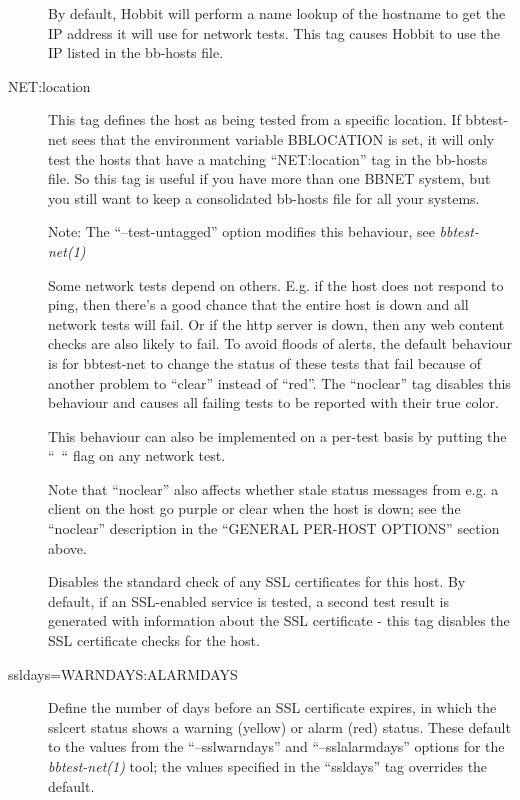 \begin{description}
\item[] By default, Hobbit will perform a name lookup of the
  hostname to get the IP address it will use for network tests. This
  tag causes Hobbit to use the IP listed in the bb-hosts file. 


 

\item[NET:location] This tag defines the host as being tested from a
  specific location. If bbtest-net sees that the environment variable
  BBLOCATION is set, it will only test the hosts that have a matching
  ``NET:location'' tag in the bb-hosts file. So this tag is useful if
  you have more than one BBNET system, but you still want to keep a
  consolidated bb-hosts file for all your systems. 


  Note: The ``--test-untagged'' option modifies this behaviour, see \emph{bbtest-net(1)}



 

\item[] Some network tests depend on others. E.g. if the host
  does not respond to ping, then there's a good chance that the entire
  host is down and all network tests will fail. Or if the http server
  is down, then any web content checks are also likely to fail. To
  avoid floods of alerts, the default behaviour is for bbtest-net to
  change the status of these tests that fail because of another
  problem to ``clear'' instead of ``red''. The ``noclear'' tag
  disables this behaviour and causes all failing tests to be reported
  with their true color. 


  This behaviour can also be implemented on a per-test basis by putting the ``~`` flag on any network test. 


  Note that ``noclear'' also affects whether stale status messages
  from e.g. a client on the host go purple or clear when the host is
  down; see the ``noclear'' description in the ``GENERAL PER-HOST
  OPTIONS'' section above. 

\item[] Disables the standard check of any SSL certificates
  for this host. By default, if an SSL-enabled service is tested, a
  second test result is generated with information about the SSL
  certificate - this tag disables the SSL certificate checks for the
  host. 


 

\item[ssldays=WARNDAYS:ALARMDAYS] Define the number of days before an
  SSL certificate expires, in which the sslcert status shows a warning
  (yellow) or alarm (red) status. These default to the values from the
  ``--sslwarndays'' and ``--sslalarmdays'' options for the
  \emph{bbtest-net(1)} tool; the values specified in the ``ssldays''
  tag overrides the default. 



\end{description}
